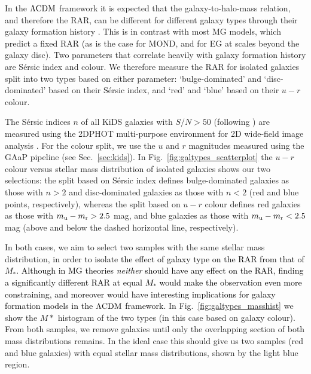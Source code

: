 \documentclass[usenatbib]{mnras}
\newcommand{\lcdm}{{\rm \Lambda CDM}}
\newcommand{\un}[1]{_{\rm #1}}
\begin{document}
In the $\lcdm$ framework it is expected that the galaxy-to-halo-mass relation, and therefore the RAR, can be different for different galaxy types through their galaxy formation history \cite[]{dutton2010,matthee2017,posti2019,marasco2020}. This is in contrast with most MG models, which predict a fixed RAR (as is the case for MOND, and for EG at scales beyond the galaxy disc). Two parameters that correlate heavily with galaxy formation history are S\'ersic index and colour. We therefore measure the RAR for isolated galaxies split into two types based on either parameter: `bulge-dominated' and `disc-dominated' based on their S\'ersic index, and `red' and `blue' based on their $u-r$ colour.

The S\'ersic indices $n$ of all KiDS galaxies with $S/N > 50$ (following \cite{roy2018}) are measured using the \textsc{2DPHOT} multi-purpose environment for 2D wide-field image analysis \cite[]{barbera2008}. For the colour split, we use the $u$ and $r$ magnitudes measured using the GAaP pipeline (see Sec.~\ref{sec:kids}). In Fig.~\ref{fig:galtypes_scatterplot} the $u-r$ colour versus stellar mass distribution of isolated galaxies shows our two selections: the split based on S\'ersic index defines bulge-dominated galaxies as those with $n > 2$ and disc-dominated galaxies as those with $n<2$ (red and blue points, respectively), whereas the split based on $u-r$ colour defines red galaxies as those with $m\un{u} - m\un{r} > 2.5$ mag, and blue galaxies as those with $m\un{u} - m\un{r} < 2.5$ mag (above and below the dashed horizontal line, respectively).

In both cases, we aim to select two samples with the same stellar mass distribution, \textcolor{black}{in order to isolate the effect of galaxy type on the RAR from that of $M_*$. Although in MG theories \emph{neither} should have any effect on the RAR, finding a significantly different RAR at equal $M_*$ would make the observation even more constraining, and moreover would have interesting implications for galaxy formation models in the $\lcdm$ framework.} In Fig.~\ref{fig:galtypes_masshist} we show the $M*$ histogram of the two types (in this case based on galaxy colour). From both samples, we remove galaxies until only the overlapping section of both mass distributions remains. In the ideal case this should give us two samples (red and blue galaxies) with equal stellar mass distributions, shown by the light blue region.
\end{document}
